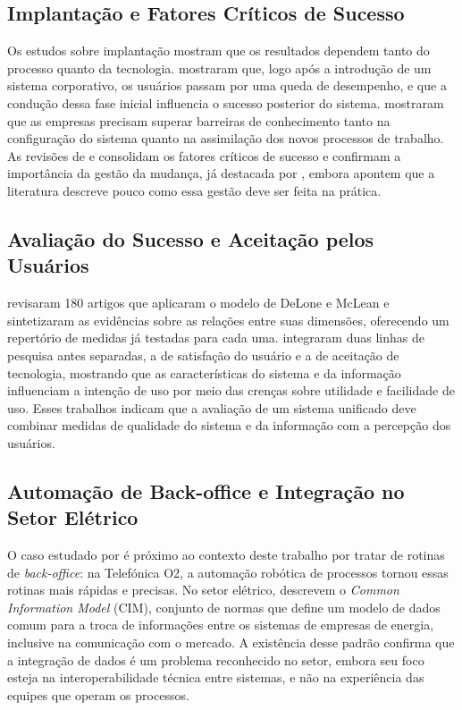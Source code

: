 \subsection{Implantação e Fatores Críticos de Sucesso}

Os estudos sobre implantação mostram que os resultados dependem tanto do processo quanto da tecnologia. \citet{tong2015} mostraram que, logo após a introdução de um sistema corporativo, os usuários passam por uma queda de desempenho, e que a condução dessa fase inicial influencia o sucesso posterior do sistema. \citet{robey2002} mostraram que as empresas precisam superar barreiras de conhecimento tanto na configuração do sistema quanto na assimilação dos novos processos de trabalho. As revisões de \citet{finney2007} e \citet{shaul2013} consolidam os fatores críticos de sucesso e confirmam a importância da gestão da mudança, já destacada por \citet{nah2001}, embora apontem que a literatura descreve pouco como essa gestão deve ser feita na prática.

\subsection{Avaliação do Sucesso e Aceitação pelos Usuários}

\citet{petter2008} revisaram 180 artigos que aplicaram o modelo de DeLone e McLean e sintetizaram as evidências sobre as relações entre suas dimensões, oferecendo um repertório de medidas já testadas para cada uma. \citet{wixom2005} integraram duas linhas de pesquisa antes separadas, a de satisfação do usuário e a de aceitação de tecnologia, mostrando que as características do sistema e da informação influenciam a intenção de uso por meio das crenças sobre utilidade e facilidade de uso. Esses trabalhos indicam que a avaliação de um sistema unificado deve combinar medidas de qualidade do sistema e da informação com a percepção dos usuários.

\subsection{Automação de Back-office e Integração no Setor Elétrico}

O caso estudado por \citet{lacity2016} é próximo ao contexto deste trabalho por tratar de rotinas de \textit{back-office}: na Telefónica O2, a automação robótica de processos tornou essas rotinas mais rápidas e precisas. No setor elétrico, \citet{uslar2012} descrevem o \textit{Common Information Model} (CIM), conjunto de normas que define um modelo de dados comum para a troca de informações entre os sistemas de empresas de energia, inclusive na comunicação com o mercado. A existência desse padrão confirma que a integração de dados é um problema reconhecido no setor, embora seu foco esteja na interoperabilidade técnica entre sistemas, e não na experiência das equipes que operam os processos.

